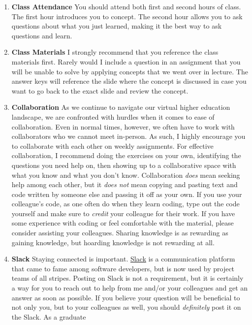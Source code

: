 \documentclass[11pt,]{article}
\begin{document}
\begin{enumerate}
\def\labelenumi{\arabic{enumi}.}
\item
  \textbf{Class Attendance} You should attend both first and second
  hours of class. The first hour introduces you to concept. The second
  hour allows you to ask questions about what you just learned, making
  it the best way to ask questions and learn.
\item
  \textbf{Class Materials} I strongly recommend that you reference the
  class materials first. Rarely would I include a question in an
  assignment that you will be unable to solve by applying concepts that
  we went over in lecture. The answer keys will reference the slide
  where the concept is discussed in case you want to go back to the
  exact slide and review the concept.
\item
  \textbf{Collaboration} As we continue to navigate our virtual higher
  education landscape, we are confronted with hurdles when it comes to
  ease of collaboration. Even in normal times, however, we often have to
  work with collaborators who we cannot meet in-person. As such, I
  highly encourage you to collaborate with each other on weekly
  assignments. For effective collaboration, I recommend doing the
  exercises on your own, identifying the questions you need help on,
  then showing up to a collaborative space with what you know and what
  you don't know. Collaboration \emph{does} mean seeking help among each
  other, but it \emph{does not} mean copying and pasting text and code
  written by someone else and passing it off as your own. If you use
  your colleague's code, as one often do when they learn coding, type
  out the code yourself and make sure to \emph{credit} your colleague
  for their work. If you have some experience with coding or feel
  comfortable with the material, please consider assisting your
  colleagues. Sharing knowledge is as rewarding as gaining knowledge,
  but hoarding knowledge is not rewarding at all.
\item
  \textbf{Slack} Staying connected is important.
  \href{https://slack.com/}{Slack} is a communication platform that came
  to fame among software developers, but is now used by project teams of
  all stripes. Posting on Slack is not a requirement, but it is
  certainly a way for you to reach out to help from me and/or your
  colleagues and get an answer as soon as possible. If you believe your
  question will be beneficial to not only you, but to your colleagues as
  well, you should \emph{definitely} post it on the Slack. As a graduate

\end{enumerate}
\end{document}
